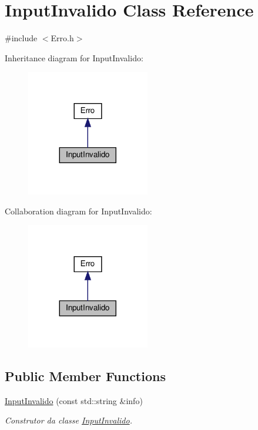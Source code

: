 \hypertarget{classInputInvalido}{}\section{Input\+Invalido Class Reference}
\label{classInputInvalido}


{\ttfamily \#include $<$Erro.\+h$>$}



Inheritance diagram for Input\+Invalido\+:
\nopagebreak
\begin{figure}[H]
\begin{center}
\leavevmode
\includegraphics[width=152pt]{classInputInvalido__inherit__graph}
\end{center}
\end{figure}


Collaboration diagram for Input\+Invalido\+:
\nopagebreak
\begin{figure}[H]
\begin{center}
\leavevmode
\includegraphics[width=152pt]{classInputInvalido__coll__graph}
\end{center}
\end{figure}
\subsection*{Public Member Functions}
\begin{DoxyCompactItemize}
\item 
\hyperlink{classInputInvalido_aa24dddc4e0de404949099c741266e193}{Input\+Invalido} (const std\+::string \&info)
\begin{DoxyCompactList}\small\item\em Construtor da classe \hyperlink{classInputInvalido}{Input\+Invalido}. \end{DoxyCompactList}\end{DoxyCompactItemize}


